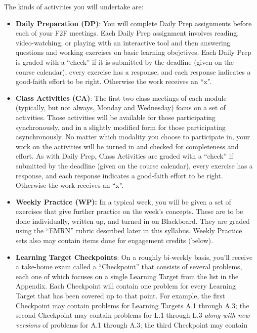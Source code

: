 \documentclass[]{article}
\providecommand{\tightlist}{%
  \setlength{\itemsep}{0pt}\setlength{\parskip}{0pt}}
\begin{document}
The kinds of activities you will undertake are:

\begin{itemize}
\tightlist
\item
  \textbf{Daily Preparation (DP)}: You will complete Daily Prep
  assignments before each of your F2F meetings. Each Daily Prep
  assignment involves reading, video-watching, or playing with an
  interactive tool and then answering questions and working exercises on
  basic learning obejctives. Each Daily Prep is graded with a ``check''
  if it is submitted by the deadline (given on the course calendar),
  every exercise has a response, and each response indicates a
  good-faith effort to be right. Otherwise the work receives an ``x''.
\item
  \textbf{Class Activities (CA)}: The first two class meetings of each
  module (typically, but not always, Monday and Wednesday) focus on a
  set of activities. Those activities will be available for those
  participating synchronously, and in a slightly modified form for those
  participating asynchronously. No matter which modality you choose to
  participate in, your work on the activities will be turned in and
  checked for completeness and effort. As with Daily Prep, Class
  Activities are graded with a ``check'' if submitted by the deadline
  (given on the course calendar), every exercise has a response, and
  each response indicates a good-faith effort to be right. Otherwise the
  work receives an ``x''.
\item
  \textbf{Weekly Practice (WP):} In a typical week, you will be given a
  set of exercises that give further practice on the week's concepts.
  These are to be done individually, written up, and turned in on
  Blackboard. They are graded using the ``EMRN'' rubric described later
  in this syllabus. Weekly Practice sets also may contain items done for
  engagement credits (below).
\item
  \textbf{Learning Target Checkpoints}: On a roughly bi-weekly basis,
  you'll receive a take-home exam called a ``Checkpoint'' that consists
  of several problems, each one of which focuses on a single Learning
  Target from the list in the Appendix. Each Checkpoint will contain one
  problem for every Learning Target that has been covered up to that
  point. For example, the first Checkpoint may contain problems for
  Learning Targets A.1 through A.3; the second Checkpoint may contain
  problems for L.1 through L.3 \emph{along with new versions} of
  problems for A.1 through A.3; the third Checkpoint may contain

\end{itemize}
\end{document}
